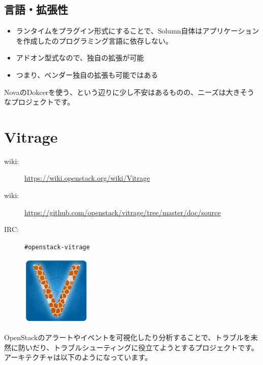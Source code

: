 \subsection*{言語・拡張性}
\begin{itemize}
	\item ランタイムをプラグイン形式にすることで、Solumn自体はアプリケーションを作成したのプログラミング言語に依存しない。
	\item アドオン型式なので、独自の拡張が可能
	\item つまり、ベンダー独自の拡張も可能ではある
\end{itemize}

NovaのDokcerを使う、という辺りに少し不安はあるものの、ニーズは大きそうなプロジェクトです。

\section{Vitrage}

\begin{description}
	\item[wiki:] \url{https://wiki.openstack.org/wiki/Vitrage}
	\item[wiki:] \url{https://github.com/openstack/vitrage/tree/master/doc/source}
	\item[IRC:] \verb|#openstack-vitrage|
\end{description}

\begin{figure}
	\begin{center}
		\includegraphics[width=0.3\textwidth]{img/Vitrage_logo_finaly.png}
	\end{center}
\end{figure}

OpenStackのアラートやイベントを可視化したり分析することで、トラブルを未然に防いだり、トラブルシューティングに役立てようとするプロジェクトです。アーキテクチャは以下のようになっています。

